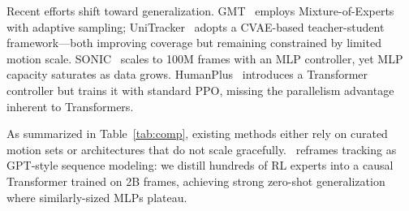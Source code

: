Recent efforts shift toward generalization. GMT~\cite{gmt25} employs Mixture-of-Experts with adaptive sampling; UniTracker~\cite{unitracker25} adopts a CVAE-based teacher-student framework---both improving coverage but remaining constrained by limited motion scale. SONIC~\cite{sonic25} scales to 100M frames with an MLP controller, yet MLP capacity saturates as data grows. HumanPlus~\cite{humanplus24} introduces a Transformer controller but trains it with standard PPO, missing the parallelism advantage inherent to Transformers.

As summarized in Table~\ref{tab:comp}, existing methods either rely on curated motion sets or architectures that do not scale gracefully. \methodname~reframes tracking as GPT-style sequence modeling: we distill hundreds of RL experts into a causal Transformer trained on 2B frames, achieving strong zero-shot generalization where similarly-sized MLPs plateau.
